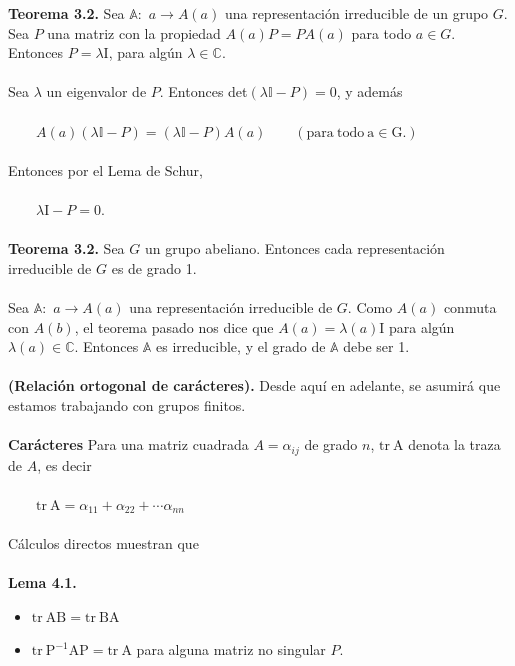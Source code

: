 \documentclass[12pt]{book}
\theoremstyle{definition}
\newcounter{in}
\newcounter{ini}
\begin{document}
\textbf{Teorema 3.2.} Sea $\mathbb{A}:$ $a\rightarrow A\left(a\right)$ una representación irreducible de un grupo $G$. Sea $P$ una matriz con la propiedad $A(a)P=PA(a)$ para todo $a \in G$. Entonces $P=\lambda \mathrm{I}$, para algún $\lambda \in \mathbb{C}$.\\~\\
Sea $\lambda$ un eigenvalor de $P$. Entonces det$(\lambda \mathbb{I} - P)=0$, y además\\~\\
$\qquad A(a)(\lambda \mathbb{I} - P)=(\lambda \mathbb{I} - P)A(a) \qquad \mathrm{(para\ todo\ a \in G.)}$\\~\\
Entonces por el Lema de Schur,\\~\\
$\qquad \lambda \mathrm{I}-P=0$.\\~\\
\textbf{Teorema 3.2.} Sea $G$ un grupo abeliano. Entonces cada representación irreducible de $G$ es de grado 1.\\~\\
Sea $\mathbb{A}:$ $a\rightarrow A\left(a\right)$ una representación irreducible de $G$. Como $A(a)$ conmuta con $A(b)$, el teorema pasado nos dice que $A(a)=\lambda(a) \mathrm{I}$ para algún $\lambda(a) \in \mathbb{C}$. Entonces $\mathbb{A}$ es irreducible, y el grado de $\mathbb{A}$ debe ser 1.\\~\\
\textbf{(Relación ortogonal de carácteres).} Desde aquí en adelante, se asumirá que estamos trabajando con grupos finitos.\\~\\
\textbf{Carácteres} Para una matriz cuadrada $A=\alpha_{ij}$ de grado $n$, $\mathrm{tr\ A}$ denota la traza de $A$, es decir\\~\\
$\qquad \mathrm{tr\ A}=\alpha_{11}+\alpha_{22}+ \cdots \alpha_{nn}$\\~\\
Cálculos directos muestran que\\~\\
\textbf{Lema 4.1. }
\begin{itemize}
\item $\mathrm{tr\ AB}=\mathrm{tr\ BA}$
\item $\mathrm{tr\ P^{-1}AP}=\mathrm{tr\ A}$ para alguna matriz no singular $P$.\\~\\
\end{itemize}
\end{document}
